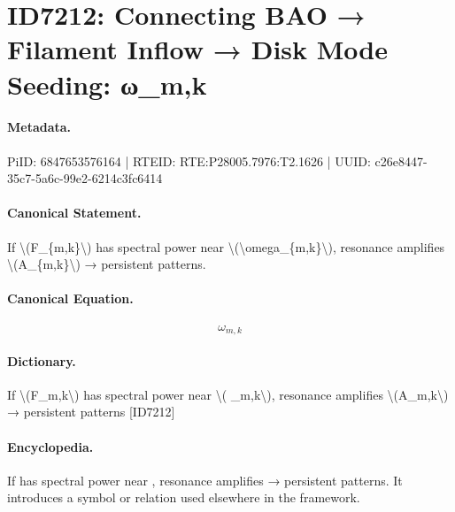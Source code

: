 \section*{ID7212: Connecting BAO → Filament Inflow → Disk Mode Seeding: ω\_m,k}
\paragraph{Metadata.}
PiID: 6847653576164 | RTEID: RTE:P28005.7976:T2.1626 | UUID: c26e8447-35c7-5a6c-99e2-6214c3fc6414

\paragraph{Canonical Statement.}
If \textbackslash{}(F\_\{m,k\}\textbackslash{}) has spectral power near \textbackslash{}(\textbackslash{}omega\_\{m,k\}\textbackslash{}), resonance amplifies \textbackslash{}(A\_\{m,k\}\textbackslash{}) → persistent patterns.

\paragraph{Canonical Equation.}
\[
\omega_{m,k}
\]

\paragraph{Dictionary.}
If \textbackslash{}(F\_m,k\textbackslash{}) has spectral power near \textbackslash{}( \_m,k\textbackslash{}), resonance amplifies \textbackslash{}(A\_m,k\textbackslash{}) → persistent patterns [ID7212]

\paragraph{Encyclopedia.}
If has spectral power near , resonance amplifies → persistent patterns. It introduces a symbol or relation used elsewhere in the framework.
